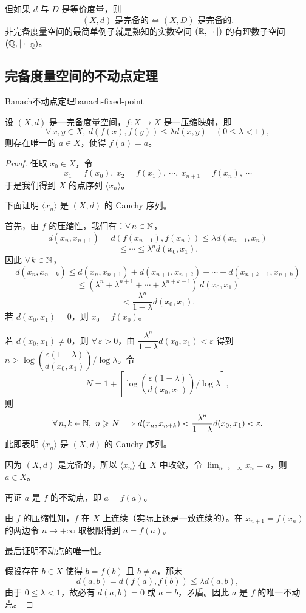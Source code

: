 但如果 $d$ 与 $D$ 是等价度量，则
\[(X,d)\text{ 是完备的}\Longleftrightarrow(X,D)\text{ 是完备的}.\]
非完备度量空间的最简单例子就是熟知的实数空间 $(\mathbb{R},|\cdot|)$ 的有理数子空间 $(\mathbb{Q},|\cdot|_{\mathbb{Q}})$。

\subsection{完备度量空间的不动点定理}
	\label{sec:10-4-3}

\begin{mythm}{Banach不动点定理}{banach-fixed-point}

设 $(X,d)$ 是一完备度量空间，$f:X\to X$ 是一压缩映射，即
\[\forall\,x,y\in X,\ d(f(x),f(y))\leqslant\lambda d(x,y)\quad(0\leqslant\lambda<1),\]
则存在唯一的 $a\in X$，使得 $f(a)=a$。

\end{mythm}

\begin{proof}

任取 $x_0\in X$，令
\[x_1=f(x_0),\ x_2=f(x_1),\ \cdots,\ x_{n+1}=f(x_n),\ \cdots\]
于是我们得到 $X$ 的点序列 $\langle x_n\rangle$。

下面证明 $\langle x_n\rangle$ 是 $(X,d)$ 的 Cauchy 序列。

首先，由 $f$ 的压缩性，我们有：$\forall\,n\in\mathbb{N}$，
\[d(x_n,x_{n+1})=d(f(x_{n-1}),f(x_n))\leqslant\lambda d(x_{n-1},x_n)\]
\[\leqslant\cdots\leqslant\lambda^nd(x_0,x_1).\]
因此 $\forall\,k\in\mathbb{N}$，
\[d(x_n,x_{n+k})\leqslant d(x_n,x_{n+1})+d(x_{n+1},x_{n+2})+\cdots+d(x_{n+k-1},x_{n+k})\]
\[\leqslant(\lambda^n+\lambda^{n+1}+\cdots+\lambda^{n+k-1})\,d(x_0,x_1)\]
\[<\frac{\lambda^n}{1-\lambda}d(x_0,x_1).\]
若 $d(x_0,x_1)=0$，则 $x_0=f(x_0)$。

若 $d(x_0,x_1)\neq0$，则 $\forall\,\varepsilon>0$，由 $\dfrac{\lambda^n}{1-\lambda}d(x_0,x_1)<\varepsilon$ 得到 $n>\log\left(\dfrac{\varepsilon(1-\lambda)}{d(x_0,x_1)}\right)\Big/\log\lambda$。令
\[N=1+\left[\log\left(\frac{\varepsilon(1-\lambda)}{d(x_0,x_1)}\right)\Big/\log\lambda\right],\]
则
\[\forall\,n,k\in\mathbb{N},\ n\geqslant N\Longrightarrow d(x_n,x_{n+k})<\frac{\lambda^n}{1-\lambda}d(x_0,x_1)<\varepsilon.\]
此即表明 $\langle x_n\rangle$ 是 $(X,d)$ 的 Cauchy 序列。

因为 $(X,d)$ 是完备的，所以 $\langle x_n\rangle$ 在 $X$ 中收敛，令 $\displaystyle\lim_{n\to+\infty}x_n=a$，则 $a\in X$。

再证 $a$ 是 $f$ 的不动点，即 $a=f(a)$。

由 $f$ 的压缩性知，$f$ 在 $X$ 上连续（实际上还是一致连续的）。在 $x_{n+1}=f(x_n)$ 的两边令 $n\to+\infty$ 取极限得到 $a=f(a)$。

最后证明不动点的唯一性。

假设存在 $b\in X$ 使得 $b=f(b)$ 且 $b\neq a$，那末
\[d(a,b)=d(f(a),f(b))\leqslant\lambda d(a,b),\]
由于 $0\leqslant\lambda<1$，故必有 $d(a,b)=0$ 或 $a=b$，矛盾。因此 $a$ 是 $f$ 的唯一不动点。

\end{proof}

